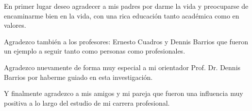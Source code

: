 \begin{agradecimientos}
En primer lugar deseo agradecer a mis padres por darme la vida y preocuparse de encaminarme bien en la vida, con una rica educación tanto académica como en valores.

Agradezco también a los profesores: Ernesto Cuadros y Dennis Barrios que fueron un ejemplo a seguir tanto como personas como profesionales.

Agradezco nuevamente de forma muy especial a mi orientador Prof. Dr. Dennis Barrios por haberme guiado en esta investigación.

Y finalmente agradezco a mis amigos y mi pareja que fueron una influencia muy positiva a lo largo del estudio de mi carrera profesional.
\end{agradecimientos}
